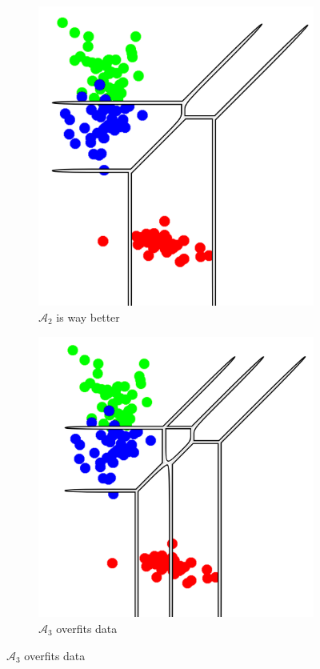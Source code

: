 \documentclass[oneside,english]{amsart}
\numberwithin{equation}{section}
\numberwithin{figure}{section}
\theoremstyle{plain}
\theoremstyle{definition}
\theoremstyle{plain}
\theoremstyle{remark}
\theoremstyle{plain}
\theoremstyle{definition}
\theoremstyle{definition}
\begin{document}
\begin{figure}
    \begin{subfigure}{0.45\textwidth}
        \centering
        \includegraphics[width=\linewidth]{fig/veronese_A2.png}
        \caption{$\mathcal{A}_2$ is way better}
        \label{fig:veronese_A2}
    \end{subfigure}
    \hfill %
    \begin{subfigure}{0.45\textwidth}
        \centering
        \includegraphics[width=\linewidth]{fig/veronese_A3.png}
        \caption{$\mathcal{A}_3$ overfits data}
        \label{fig:veronese_A3}
    \end{subfigure}


\end{figure}
\end{document}
